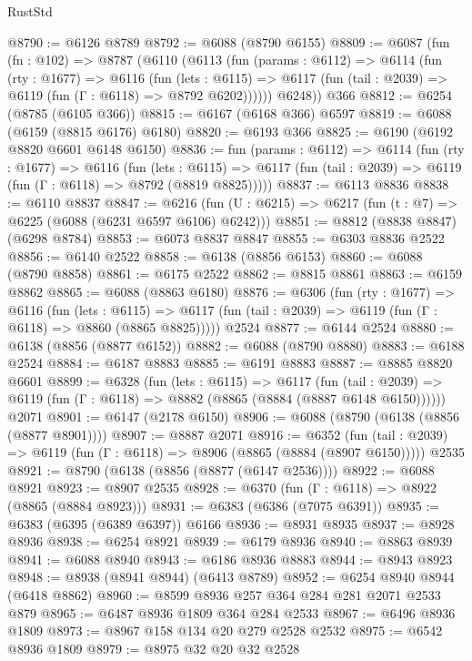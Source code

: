 \begin{lexlean}{RustStd}
\begin{coremodule}
@8790 := @6126 @8789
@8792 := @6088 (@8790 @6155)
@8809 := @6087
    (fun (fn : @102) =>
    @8787
      (@6110
        (@6113
          (fun (params : @6112) =>
          @6114
            (fun (rty : @1677) =>
            @6116
              (fun (lets : @6115) =>
              @6117 (fun (tail : @2039) => @6119 (fun (Γ : @6118) => @8792 @6202))))))
        @6248))
    @366
@8812 := @6254 (@8785 (@6105 @366))
@8815 := @6167 (@6168 @366) @6597
@8819 := @6088 (@6159 (@8815 @6176) @6180)
@8820 := @6193 @366
@8825 := @6190 (@6192 @8820 @6601 @6148 @6150)
@8836 := fun (params : @6112) =>
  @6114
    (fun (rty : @1677) =>
    @6116
      (fun (lets : @6115) =>
      @6117 (fun (tail : @2039) => @6119 (fun (Γ : @6118) => @8792 (@8819 @8825)))))
@8837 := @6113 @8836
@8838 := @6110 @8837
@8847 := @6216 (fun (U : @6215) => @6217 (fun (t : @7) => @6225 (@6088 (@6231 @6597 @6106) @6242)))
@8851 := @8812 (@8838 @8847) (@6298 @8784)
@8853 := @6073 @8837 @8847
@8855 := @6303 @8836 @2522
@8856 := @6140 @2522
@8858 := @6138 (@8856 @6153)
@8860 := @6088 (@8790 @8858)
@8861 := @6175 @2522
@8862 := @8815 @8861
@8863 := @6159 @8862
@8865 := @6088 (@8863 @6180)
@8876 := @6306
    (fun (rty : @1677) =>
    @6116
      (fun (lets : @6115) =>
      @6117 (fun (tail : @2039) => @6119 (fun (Γ : @6118) => @8860 (@8865 @8825)))))
    @2524
@8877 := @6144 @2524
@8880 := @6138 (@8856 (@8877 @6152))
@8882 := @6088 (@8790 @8880)
@8883 := @6188 @2524
@8884 := @6187 @8883
@8885 := @6191 @8883
@8887 := @8885 @8820 @6601
@8899 := @6328
    (fun (lets : @6115) =>
    @6117
      (fun (tail : @2039) => @6119 (fun (Γ : @6118) => @8882 (@8865 (@8884 (@8887 @6148 @6150))))))
    @2071
@8901 := @6147 (@2178 @6150)
@8906 := @6088 (@8790 (@6138 (@8856 (@8877 @8901))))
@8907 := @8887 @2071
@8916 := @6352
    (fun (tail : @2039) => @6119 (fun (Γ : @6118) => @8906 (@8865 (@8884 (@8907 @6150)))))
    @2535
@8921 := @8790 (@6138 (@8856 (@8877 (@6147 @2536))))
@8922 := @6088 @8921
@8923 := @8907 @2535
@8928 := @6370 (fun (Γ : @6118) => @8922 (@8865 (@8884 @8923)))
@8931 := @6383 (@6386 (@7075 @6391))
@8935 := @6383 (@6395 (@6389 @6397)) @6166
@8936 := @8931 @8935
@8937 := @8928 @8936
@8938 := @6254 @8921
@8939 := @6179 @8936
@8940 := @8863 @8939
@8941 := @6088 @8940
@8943 := @6186 @8936 @8883
@8944 := @8943 @8923
@8948 := @8938 (@8941 @8944) (@6413 @8789)
@8952 := @6254 @8940 @8944 (@6418 @8862)
@8960 := @8599 @8936 @257 @364 @284 @281 @2071 @2533 @879
@8965 := @6487 @8936 @1809 @364 @284 @2533
@8967 := @6496 @8936 @1809
@8973 := @8967 @158 @134 @20 @279 @2528 @2532
@8975 := @6542 @8936 @1809
@8979 := @8975 @32 @20 @32 @2528

\end{coremodule}
\end{lexlean}
